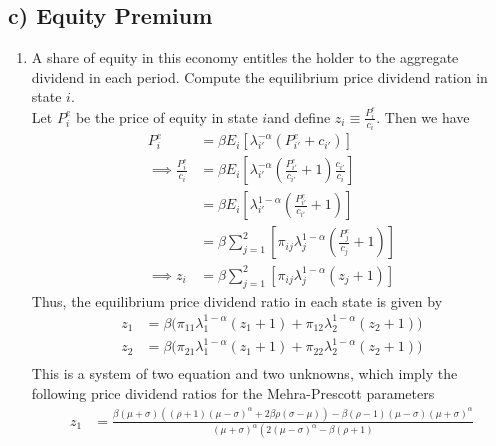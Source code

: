 \documentclass[french]{article}
\begin{document}
\subsection*{c) Equity Premium}
\begin{enumerate}[I]
	\item A share of equity in this economy entitles the holder to the aggregate dividend in each period. Compute the equilibrium price dividend ration in state $i$. \\
	Let $P^e_i$ be the price of equity in state $i$and define $z_i \equiv \frac{P^e_i}{c_i}$. Then we have 
	\begin{equation}
	\begin{split}
		P^e_i &= \beta E_i\left[\lambda_{i'}^{-\alpha}(P^e_{i'} + c_{i'})\right]\\
		\implies \frac{P^e_i}{c_i}& = \beta E_i\left[\lambda_{i'}^{-\alpha}(\frac{P^e_{i'}}{c_{i'}} + 1)\frac{c_{i'}}{c_i}\right]\\
		&=\beta E_i\left[\lambda_{i'}^{1-\alpha}(\frac{P^e_{i'}}{c_{i'}} + 1)\right]\\
		&= \beta \sum_{j=1}^{2}\left[\pi_{ij}\lambda_j^{1-\alpha}\left(\frac{P^e_{j}}{c_{j}} + 1\right)\right]\\
		\implies z_i &=  \beta \sum_{j=1}^{2}\left[\pi_{ij}\lambda_j^{1-\alpha}\left(z_j + 1\right)\right]
	\end{split}
	\label{eq:price_dividend_ratio}
	\end{equation}
 Thus, the equilibrium price dividend ratio in each state is given by 	
	\begin{equation*}
		\begin{split}
		z_1 &=\beta\bigg(\pi_{11}\lambda_1^{1-\alpha}(z_1 + 1) + \pi_{12}\lambda_2^{1-\alpha}(z_2 + 1) \bigg)\\
		z_2& = \beta\bigg(\pi_{21}\lambda_1^{1-\alpha}(z_1 + 1) + \pi_{22}\lambda_2^{1-\alpha}(z_2 + 1) \bigg)\\
		\end{split}
	\end{equation*}
	This is a system of two equation and two unknowns, which imply the following price dividend ratios for the Mehra-Prescott parameters
	\begin{equation*}
		\begin{split}
		z_1 &= \frac{\beta  (\mu +\sigma ) \left((\rho +1) (\mu
			-\sigma )^{\alpha }+2 \beta  \rho  (\sigma -\mu
			)\right)-\beta  (\rho -1) (\mu -\sigma ) (\mu
			+\sigma )^{\alpha }}{(\mu +\sigma )^{\alpha }
			\left(2 (\mu -\sigma )^{\alpha }-\beta  (\rho +1)
}
\end{split}
\end{equation*}
\end{enumerate}
\end{document}
